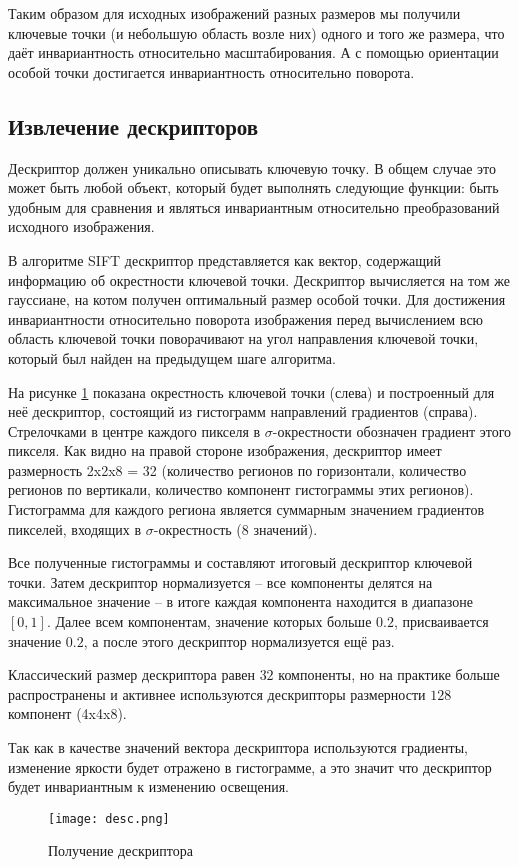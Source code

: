 Таким образом для исходных изображений разных размеров мы получили ключевые точки (и небольшую область возле них) одного и того же размера, что даёт инвариантность относительно масштабирования. А с помощью ориентации особой точки достигается инвариантность относительно поворота.

\subsection{Извлечение дескрипторов}

Дескриптор должен уникально описывать ключевую точку. В общем случае это может быть любой объект, который будет выполнять следующие функции: быть удобным для сравнения и являться инвариантным относительно преобразований исходного изображения.

В алгоритме SIFT дескриптор представляется как вектор, содержащий информацию об окрестности ключевой точки. Дескриптор вычисляется на том же гауссиане, на котом получен оптимальный размер особой точки. Для достижения инвариантности относительно поворота изображения перед вычислением всю область ключевой точки поворачивают на угол направления ключевой точки, который был найден на предыдущем шаге алгоритма.

На рисунке \ref{fig:desc} показана окрестность ключевой точки (слева) и построенный для неё дескриптор, состоящий из гистограмм направлений градиентов (справа). Стрелочками в центре каждого пикселя в $\sigma$-окрестности обозначен градиент этого пикселя. Как видно на правой стороне изображения, дескриптор имеет размерность 2x2x8 = 32 (количество регионов по горизонтали, количество регионов по вертикали, количество компонент гистограммы этих регионов). Гистограмма для каждого региона является суммарным значением градиентов пикселей, входящих в $\sigma$-окрестность ($8$ значений).

Все полученные гистограммы и составляют итоговый дескриптор ключевой точки. Затем дескриптор нормализуется -- все компоненты делятся на максимальное значение -- в итоге каждая компонента находится в диапазоне $[0,1]$. Далее всем компонентам, значение которых больше $0.2$, присваивается значение $0.2$, а после этого дескриптор нормализуется ещё раз.

Классический размер дескриптора равен $32$ компоненты, но на практике больше распространены и активнее используются дескрипторы размерности $128$ компонент (4x4x8).

Так как в качестве значений вектора дескриптора используются градиенты, изменение яркости будет отражено в гистограмме, а это значит что дескриптор будет инвариантным к изменению освещения.

\begin{figure}[h]
    \centering
    \texttt{[image: desc.png]}
    \caption{Получение дескриптора}
    \label{fig:desc}
\end{figure}